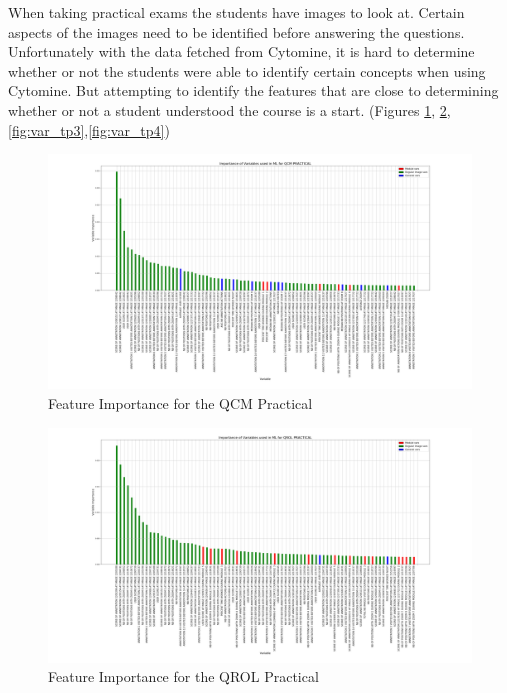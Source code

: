 \documentclass[a4paper,11pt]{report}
\numberwithin{figure}{section} %
\begin{document}
    When taking practical exams the students have images to look at.
    Certain aspects of the images need to be identified before answering the questions.
    Unfortunately with the data fetched from Cytomine, it is hard to determine whether or not the students were able to identify certain concepts when using Cytomine.
    But attempting to identify the features that are close to determining whether or not a student understood the course is a start. (Figures \ref{fig:var_tp1}, \ref{fig:var_tp2}, \ref{fig:var_tp3},\ref{fig:var_tp4})

     \begin{figure}[H]
      \centering
      \includegraphics[width=.95\linewidth]{plots/var_importance_QCM_PRACTICAL_2018-04-29_14_38_13.png}
      \caption{Feature Importance for the QCM Practical}
      \label{fig:var_tp1}
      \end{figure}

      \begin{figure}[H]
      \centering
      \includegraphics[width=.95\linewidth]{plots/var_importance_QROL_PRACTICAL_2018-04-29_14_37_04.png}
      \caption{Feature Importance for the QROL Practical}
      \label{fig:var_tp2}
      \end{figure}
\end{document}

